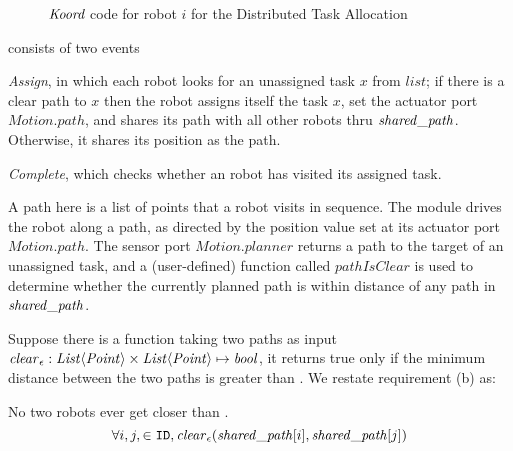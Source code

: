 \begin{figure}[t]
    {
        
    }
    {
        
    }
    \caption{ $\emph{Koord}$ code for robot $i$ for the Distributed Task Allocation}
    \label{fig:taskapp}
    \vspace{-5mm}
\end{figure}

\Task consists of two events
\begin{inparaenum}[(1)]
    \item \emph{Assign}, in which each robot looks for an unassigned task $x$ from $\mathit{list}$;
    if there is a clear path to $x$ then the robot assigns itself the task $x$,
    set the actuator port $\mathit{Motion.path}$,
    and shares its path with all other robots thru $\mathit{shared\_path}$.
    Otherwise, it shares its position as the path.
    \item \emph{Complete}, which checks whether an robot has visited its assigned task.
\end{inparaenum}
A path here is a list of points that a robot visits in sequence.
The \Motion module drives the robot along a path,
as directed by the position value set at its actuator port $\mathit{Motion.path}$.
The sensor port $\mathit{Motion.planner}$ returns a path to the target of an unassigned task,
and a (user-defined) function called $\mathit{pathIsClear}$ is used to determine
whether the currently planned path is within \ds distance of any path in $\mathit{shared\_path}$.

\newcommand{\dist}{\mathit{clear}_\ds}
\newcommand{\pathIsClear}{\mathit{pathIsClear}}
\newcommand{\PATHISCLEAR}{\mathit{PIC}}

Suppose there is a function taking two paths as input
$\dist : \mathit{List}\langle \mathit{Point}\rangle \times \mathit{List}\langle \mathit{Point}\rangle \mapsto \mathit{bool}$,
it returns true only if the minimum distance between the two paths is greater than \ds.
We restate requirement (b) as:
\begin{invariant}
\label{inv:task}
No two robots ever get closer than \ds.
\[
    \forall i,j, \in \UINS, \dist(\pathvar[i], \pathvar[j])
\]
\end{invariant}
\noindent

